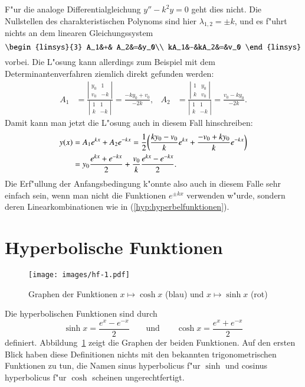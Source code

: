 F"ur die analoge Differentialgleichung $y''-k^2y=0$ geht dies nicht.
Die Nullstellen des charakteristischen Polynoms sind hier 
$\lambda_{1,2}=\pm k$, und es f"uhrt nichts an dem linearen Gleichungssystem
\[
\begin{linsys}{3}
 A_1&+& A_2&=&y_0\\
kA_1&-&kA_2&=&v_0
\end{linsys}
\]
vorbei.
Die L"osung kann allerdings zum Beispiel mit dem Determinantenverfahren
ziemlich direkt gefunden werden:
\begin{align*}
A_1
&=
\frac{\left|\begin{matrix}y_0&1\\v_0&-k\end{matrix}\right|}{\left|\begin{matrix}1&1\\k&-k\end{matrix}\right|}
=
\frac{-ky_0+v_0}{-2k},
&
A_2
&=
\frac{\left|\begin{matrix}1&y_0\\k&v_0\end{matrix}\right|}{\left|\begin{matrix}1&1\\k&-k\end{matrix}\right|}
=\frac{v_0-ky_0}{-2k}.
\end{align*}
Damit kann man jetzt die L"osung auch in diesem Fall hinschreiben:
\begin{align}
y(x)
&=
A_1e^{kx}+A_2e^{-kx}
=
\frac12\biggl(
\frac{ky_0-v_0}k e^{kx}
+
\frac{-v_0+ky_0}k e^{-kx}
\biggr)
\notag
\\
&=
y_0\frac{e^{kx}+e^{-kx}}2
+\frac{v_0}{k}\frac{e^{kx}-e^{-kx}}2.
\label{hyp:hyperbelfunktionen}
\end{align}
Die Erf"ullung der Anfangsbedingung k"onnte also auch in diesem Falle
sehr einfach sein, wenn man nicht die Funktionen $e^{\pm kx}$ verwenden
w"urde, sondern deren Linearkombinationen wie in (\ref{hyp:hyperbelfunktionen}).

\section{Hyperbolische Funktionen}
\begin{figure}
\centering
\texttt{[image: images/hf-1.pdf]}
\caption{Graphen der Funktionen $x\mapsto\cosh x$ (blau)
und $x\mapsto\sinh x$ (rot)
\label{hyp:graphen}}
\end{figure}
Die hyperbolischen Funktionen sind durch
\[
\sinh x =\frac{e^x-e^{-x}}2
\qquad\text{und}\qquad
\cosh x = \frac{e^x+e^{-x}}2
\]
definiert.
Abbildung~\ref{hyp:graphen} zeigt die Graphen der beiden Funktionen.
Auf den ersten Blick haben diese Definitionen nichts mit den bekannten
trigonometrischen Funktionen zu tun, die Namen sinus hyperbolicus f"ur
$\sinh$ und cosinus hyperbolicus f"ur $\cosh$ scheinen ungerechtfertigt.

